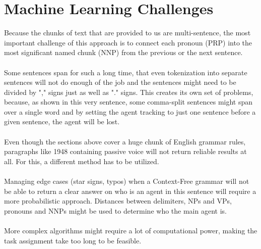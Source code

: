 \documentclass{article}
\begin{document}
\section{Machine Learning Challenges}
Because the chunks of text that are provided to us are multi-sentence, the most important challenge of this approach is to connect each pronoun (PRP) into the most significant named chunk (NNP) from the previous or the next sentence. \\ \\
Some sentences span for such a long time, that even tokenization into separate sentences will not do enough of the job and the sentences might need to be divided by "," signs just as well as "." signs. This creates its own set of problems, because, as shown in this very sentence, some comma-split sentences might span over a single word and by setting the agent tracking to just one sentence before a given sentence, the agent will be lost. \\ \\
Even though the sections above cover a huge chunk of English grammar rules, paragraphs like 1948 containing passive voice will not return reliable results at all. For this, a different method has to be utilized. \\ \\
Managing edge cases (star signs, typos) when a Context-Free grammar will not be able to return a clear answer on who is an agent in this sentence will require a more probabilistic approach. Distances between delimiters, NPs and VPs, pronouns and NNPs might be used to determine who the main agent is. \\ \\
More complex algorithms might require a lot of computational power, making the task assignment take too long to be feasible. 
\end{document}
